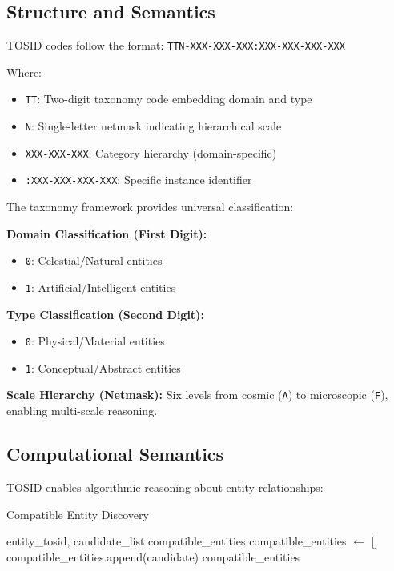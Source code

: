 \documentclass[conference]{IEEEtran}
\begin{document}
\subsection{Structure and Semantics}

TOSID codes follow the format: \texttt{TTN-XXX-XXX-XXX:XXX-XXX-XXX-XXX}

Where:
\begin{itemize}
\item \texttt{TT}: Two-digit taxonomy code embedding domain and type
\item \texttt{N}: Single-letter netmask indicating hierarchical scale  
\item \texttt{XXX-XXX-XXX}: Category hierarchy (domain-specific)
\item \texttt{:XXX-XXX-XXX-XXX}: Specific instance identifier
\end{itemize}

The taxonomy framework provides universal classification:

\textbf{Domain Classification (First Digit):}
\begin{itemize}
\item \texttt{0}: Celestial/Natural entities
\item \texttt{1}: Artificial/Intelligent entities
\end{itemize}

\textbf{Type Classification (Second Digit):}
\begin{itemize}
\item \texttt{0}: Physical/Material entities
\item \texttt{1}: Conceptual/Abstract entities  
\end{itemize}

\textbf{Scale Hierarchy (Netmask):} Six levels from cosmic (\texttt{A}) to microscopic (\texttt{F}), enabling multi-scale reasoning.

\subsection{Computational Semantics}

TOSID enables algorithmic reasoning about entity relationships:

\begin{algorithm}
\caption{Compatible Entity Discovery}
\begin{algorithmic}
\REQUIRE entity\_tosid, candidate\_list
\ENSURE compatible\_entities
\STATE compatible\_entities $\leftarrow$ []
            \STATE compatible\_entities.append(candidate)
        \ENDIF
    \ENDIF
\ENDFOR
\RETURN compatible\_entities
\end{algorithmic}
\end{algorithm}
\end{document}
